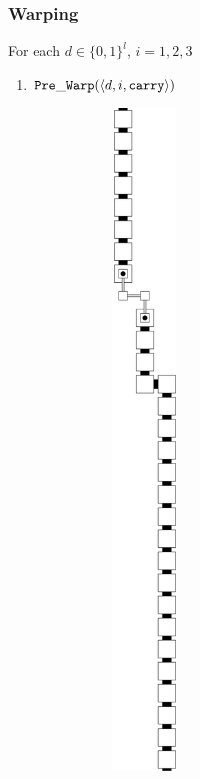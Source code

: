     \subsubsection{ Warping }

        For each $d \in \{0, 1\}^l$, $i = 1, 2, 3$

        \begin{enumerate}[label={--}]

            \item ${\tt Pre\_Warp}   (\langle d, i, {\tt carry}\rangle)$
                \begin{figure}[H]
                    \begin{subfigure}[t]{0.2\textwidth}
                        \centering
                        \includegraphics[width=0.2\textwidth]{warping/pre_warp_general}

\end{subfigure}
\end{figure}
\end{enumerate}
